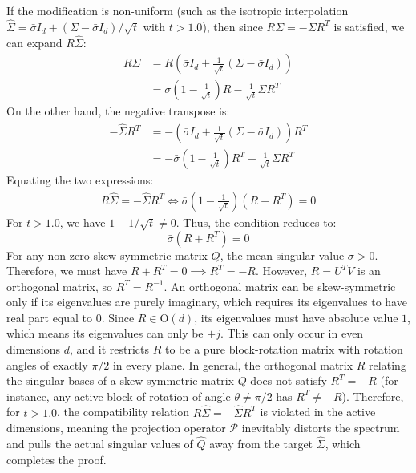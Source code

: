 If the modification is non-uniform (such as the isotropic interpolation $\hat{\Sigma} = \bar{\sigma} I_d + (\Sigma - \bar{\sigma} I_d)/\sqrt{t}$ with $t > 1.0$), then since $R \Sigma = -\Sigma R^T$ is satisfied, we can expand $R \hat{\Sigma}$:
\begin{align}
R \hat{\Sigma} &= R \left( \bar{\sigma} I_d + \frac{1}{\sqrt{t}} (\Sigma - \bar{\sigma} I_d) \right) \\
&= \bar{\sigma} \left(1 - \frac{1}{\sqrt{t}}\right) R - \frac{1}{\sqrt{t}} \Sigma R^T
\end{align}
On the other hand, the negative transpose is:
\begin{align}
-\hat{\Sigma} R^T &= - \left( \bar{\sigma} I_d + \frac{1}{\sqrt{t}} (\Sigma - \bar{\sigma} I_d) \right) R^T \\
&= -\bar{\sigma} \left(1 - \frac{1}{\sqrt{t}}\right) R^T - \frac{1}{\sqrt{t}} \Sigma R^T
\end{align}
Equating the two expressions:
\begin{align}
R \hat{\Sigma} = -\hat{\Sigma} R^T \iff \bar{\sigma} \left(1 - \frac{1}{\sqrt{t}}\right) (R + R^T) = 0
\end{align}
For $t > 1.0$, we have $1 - 1/\sqrt{t} \ne 0$. Thus, the condition reduces to:
\begin{equation}
\bar{\sigma} (R + R^T) = 0
\end{equation}
For any non-zero skew-symmetric matrix $Q$, the mean singular value $\bar{\sigma} > 0$. Therefore, we must have $R + R^T = 0 \implies R^T = -R$.
However, $R = U^T V$ is an orthogonal matrix, so $R^T = R^{-1}$. An orthogonal matrix can be skew-symmetric only if its eigenvalues are purely imaginary, which requires its eigenvalues to have real part equal to $0$. Since $R \in \mathrm{O}(d)$, its eigenvalues must have absolute value $1$, which means its eigenvalues can only be $\pm j$. This can only occur in even dimensions $d$, and it restricts $R$ to be a pure block-rotation matrix with rotation angles of exactly $\pi/2$ in every plane.
In general, the orthogonal matrix $R$ relating the singular bases of a skew-symmetric matrix $Q$ does not satisfy $R^T = -R$ (for instance, any active block of rotation of angle $\theta \ne \pi/2$ has $R^T \ne -R$). 
Therefore, for $t > 1.0$, the compatibility relation $R \hat{\Sigma} = -\hat{\Sigma} R^T$ is violated in the active dimensions, meaning the projection operator $\mathcal{P}$ inevitably distorts the spectrum and pulls the actual singular values of $\hat{Q}$ away from the target $\hat{\Sigma}$, which completes the proof.

